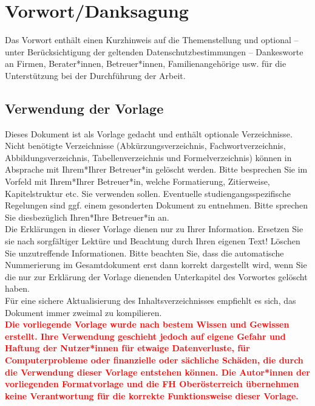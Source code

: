\chapter{Vorwort/Danksagung}

Das Vorwort enthält einen Kurzhinweis auf die Themenstellung und optional – unter Berücksichtigung der geltenden Datenschutzbestimmungen – Dankesworte an Firmen, Berater*innen, Betreuer*innen, Familienangehörige usw. für die Unterstützung bei der Durchführung der Arbeit.

\section{Verwendung der Vorlage}
Dieses Dokument ist als Vorlage gedacht und enthält optionale Verzeichnisse. Nicht benötigte Verzeichnisse (Abkürzungsverzeichnis, Fachwortverzeichnis, Abbildungsverzeichnis, Tabellenverzeichnis und Formelverzeichnis) können in Absprache mit Ihrem*Ihrer Betreuer*in gelöscht werden. Bitte besprechen Sie im Vorfeld mit Ihrem*Ihrer Betreuer*in, welche Formatierung, Zitierweise, Kapitelstruktur etc. Sie verwenden sollen. Eventuelle studiengangsspezifische Regelungen sind ggf. einem gesonderten Dokument zu entnehmen. Bitte sprechen Sie diesbezüglich Ihren*Ihre Betreuer*in an.
\vspace{6pt}\\
Die Erklärungen in dieser Vorlage dienen nur zu Ihrer Information. Ersetzen Sie sie nach sorgfältiger Lektüre und Beachtung durch Ihren eigenen Text! Löschen Sie unzutreffende Informationen. Bitte beachten Sie, dass die automatische Nummerierung im Gesamtdokument erst dann korrekt dargestellt wird, wenn Sie die nur zur Erklärung der Vorlage dienenden Unterkapitel des Vorwortes gelöscht haben.
\vspace{6pt}\\
Für eine sichere Aktualisierung des Inhaltsverzeichnisses empfiehlt es sich, das Dokument immer zweimal zu kompilieren.
\vspace{6pt}\\
\textcolor{red}{\textbf{Die vorliegende Vorlage wurde nach bestem Wissen und Gewissen erstellt. Ihre Verwendung geschieht jedoch auf eigene Gefahr und Haftung der Nutzer*innen für etwaige Datenverluste, für Computerprobleme oder finanzielle oder sächliche Schäden, die durch die Verwendung dieser Vorlage entstehen können. Die Autor*innen  der vorliegenden Formatvorlage und die FH Oberösterreich übernehmen keine Verantwortung für die korrekte Funktionsweise dieser Vorlage.}}

